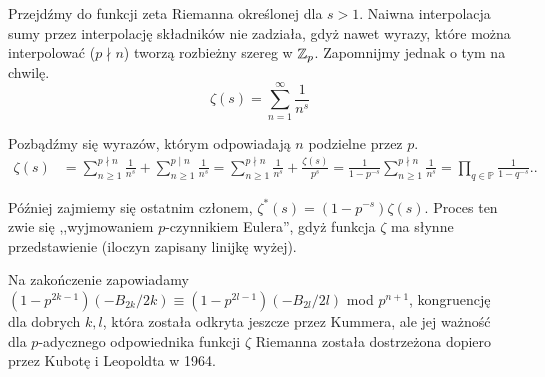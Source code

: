 Przejdźmy do funkcji zeta Riemanna określonej dla $s > 1$.
Naiwna interpolacja sumy przez interpolację składników nie zadziała, gdyż nawet wyrazy, które można interpolować ($p \nmid n$) tworzą rozbieżny szereg w $\mathbb Z_p$.
Zapomnijmy jednak o tym na chwilę.
\[
	\zeta(s) = \sum_{n = 1}^\infty \frac 1 {n^s}
\]

Pozbądźmy się wyrazów, którym odpowiadają $n$ podzielne przez $p$.
\begin{align*}
\zeta(s) & = \sum_{n \ge 1}^{p \nmid n} \frac 1{n^s} + \sum_{n \ge 1}^{p \mid n} \frac 1{n^s}= %
 \sum_{n \ge 1}^{p \nmid n} \frac{1}{n^s} + \frac{\zeta(s)}{p^s} = \frac{1}{1 - p^{-s}} \sum_{n \ge 1}^{p \nmid n} \frac 1{n^s} = \prod_{q \in \mathbb P} \frac{1}{1 - q^{-s}}..
\end{align*}

Później zajmiemy się ostatnim członem, $\zeta^*(s) = ( 1 - p^{-s}) \zeta(s)$.
Proces ten zwie się ,,wyjmowaniem $p$-czynnikiem Eulera'', gdyż funkcja $\zeta$ ma słynne przedstawienie (iloczyn zapisany linijkę wyżej).

Na zakończenie zapowiadamy $(1 - p^{2k-1})(- B_{2k} / 2k) \equiv (1 - p^{2l-1})(-B_{2l}/2l)$ mod $p^{n+1}$, kongruencję dla dobrych $k, l$, która została odkryta jeszcze przez Kummera, ale jej ważność dla $p$-adycznego odpowiednika funkcji $\zeta$ Riemanna została dostrzeżona dopiero przez Kubotę i Leopoldta w 1964.
